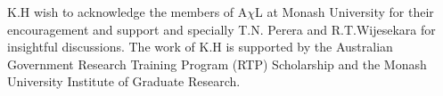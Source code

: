 K.H wish to acknowledge the members of A$\chi$L at Monash University for their encouragement and support and specially T.N. Perera and R.T.Wijesekara for insightful discussions. The work of K.H is supported by the Australian Government Research Training Program (RTP) Scholarship and the Monash University Institute of Graduate Research.
